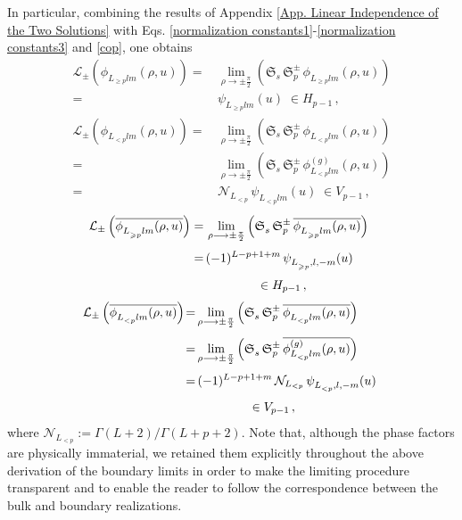 \documentclass[aps,twocolumn,nofootinbib]{revtex4}
\begin{document}
In particular, combining the results of Appendix \ref{App. Linear Independence of the Two Solutions} with Eqs. \eqref{normalization constants1}-\eqref{normalization constants3} and \eqref{cop}, one obtains
\begin{align}
    \mathcal{L}_\pm\left(\phi^{}_{L^{}_{\geqslant p}lm}(\rho,u)\right) =&\, \lim_{\rho\longrightarrow \pm\frac{\pi}{2}}\left(\mathfrak{S}^{}_s\,\mathfrak{S}^\pm_p\, \phi^{}_{L^{}_{\geqslant p}lm}(\rho,u)\right)\nonumber\\[3pt]
    =&\, \psi^{}_{L^{}_{\geqslant p}lm}(u) \;\in H_{p-1}\,, \label{eq:L-complete-final}
\end{align}
\begin{align}
    \mathcal{L}_\pm\left(\phi^{}_{L^{}_{< p}lm}(\rho,u)\right) =&\, \lim_{\rho\longrightarrow \pm\frac{\pi}{2}} \left(\mathfrak{S}^{}_s\,\mathfrak{S}^\pm_p\, \phi^{}_{L^{}_{<p}lm}(\rho,u)\right)\nonumber\\[3pt]
    =&\, \lim_{\rho\longrightarrow \pm\frac{\pi}{2}} \left(\mathfrak{S}^{}_s\,\mathfrak{S}^\pm_p\, \phi^{(g)}_{L^{}_{<p}lm}(\rho,u)\right)\nonumber\\[3pt]
    =&\, \mathcal{N}_{L_{< p}} \,\psi^{}_{L^{}_{<p}lm}(u) \;\in V_{p-1}\,, \label{bdry-true2}
\end{align}
\begin{align}
    \!\!\!\mathcal{L}_\pm \left(\overline{\phi^{}_{L^{}_{\geqslant p}lm}(\rho,u)}\right) =&\, \lim_{\rho\longrightarrow \pm\frac{\pi}{2}}\left(\mathfrak{S}^{}_s\,\mathfrak{S}^\pm_p\, \overline{\phi^{}_{L^{}_{\geqslant p}lm}(\rho,u)}\right)\nonumber\\[3pt]
    =&\, (-1)^{L-p+1+m}\, \psi^{}_{L^{}_{\geqslant p},l,-m}(u) \nonumber\\[3pt]
    &\hspace{1.5cm}\in H_{p-1}\,, \label{eq:L-complete-final'}
\end{align}
\begin{align}
    \!\!\mathcal{L}_\pm\left(\overline{\phi^{}_{L^{}_{< p}lm}(\rho,u)}\right) \!=& \lim_{\rho\longrightarrow \pm\frac{\pi}{2}} \left(\mathfrak{S}^{}_s\,\mathfrak{S}^\pm_p\, \overline{\phi^{}_{L^{}_{<p}lm}(\rho,u)}\right)\nonumber\\[3pt]
    =& \lim_{\rho\longrightarrow \pm\frac{\pi}{2}} \left(\mathfrak{S}^{}_s\,\mathfrak{S}^\pm_p\, \overline{\phi^{(g)}_{L^{}_{<p}lm}(\rho,u)}\right)\nonumber\\[3pt]
    =&\, (-1)^{L-p+1+m}\, \mathcal{N}_{L_{< p}} \,\psi^{}_{L^{}_{<p},l,-m}(u) \nonumber\\[3pt]
    &\hspace{1.5cm} \in V_{p-1}\,, \label{bdry-true2'}
\end{align}
where $\mathcal{N}_{L^{}_{< p}} := {\Gamma(L+2)}/{\Gamma(L+p+2)}$. Note that, although the phase factors are physically immaterial, we retained them explicitly throughout the above derivation of the boundary limits in order to make the limiting procedure transparent and to enable the reader to follow the correspondence between the bulk and boundary realizations.
\end{document}
